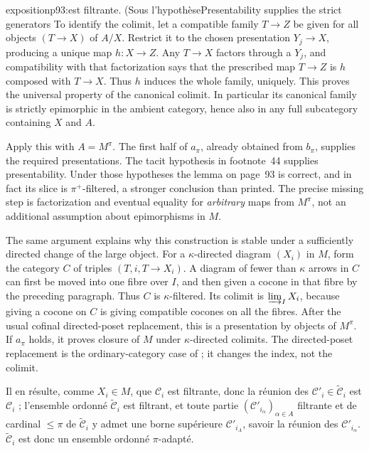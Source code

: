 \begin{dcomment}{exposition}{p93:est filtrante. (Sous l'hypothèse}{Presentability supplies the strict generators}
To identify the colimit, let a compatible family $T\to Z$ be given for all objects $(T\to X)$ of $A/X$. Restrict it to the chosen presentation $Y_j\to X$, producing a unique map $h:X\to Z$. Any $T\to X$ factors through a $Y_j$, and compatibility with that factorization says that the prescribed map $T\to Z$ is $h$ composed with $T\to X$. Thus $h$ induces the whole family, uniquely. This proves the universal property of the canonical colimit. In particular its canonical family is strictly epimorphic in the ambient category, hence also in any full subcategory containing $X$ and $A$.

Apply this with $A=M^\pi$. The first half of $a_\pi$, already obtained from $b_\pi$, supplies the required presentations. The tacit hypothesis in footnote~44 supplies presentability. Under those hypotheses the lemma on page~93 is correct, and in fact its slice is $\pi^+$-filtered, a stronger conclusion than printed. The precise missing step is factorization and eventual equality for \emph{arbitrary} maps from $M^\pi$, not an additional assumption about epimorphisms in $M$.

The same argument explains why this construction is stable under a sufficiently directed change of the large object. For a $\kappa$-directed diagram $(X_i)$ in $M$, form the category $C$ of triples $(T,i,T\to X_i)$. A diagram of fewer than $\kappa$ arrows in $C$ can first be moved into one fibre over $I$, and then given a cocone in that fibre by the preceding paragraph. Thus $C$ is $\kappa$-filtered. Its colimit is $\varinjlim_I X_i$, because giving a cocone on $C$ is giving compatible cocones on all the fibres. After the usual cofinal directed-poset replacement, this is a presentation by objects of $M^\pi$. If $a_\pi$ holds, it proves closure of $M$ under $\kappa$-directed colimits. The directed-poset replacement is the ordinary-category case of \citet[Proposition~5.3.1.18]{Lurie2009HTT}; it changes the index, not the colimit.
\end{dcomment}


Il en résulte, comme $X_i\in M$, que $\mathcal{C}_i$ est filtrante, donc la réunion des $\mathcal{C}'_i\in\tilde{\mathcal{C}}_i$ est $\mathcal{C}_i$ ; l'ensemble ordonné $\tilde{\mathcal{C}}_i$ est filtrant, et toute partie $(\mathcal{C}'_{i_\alpha})_{\alpha\in A}$ filtrante et de cardinal $\le\pi$ de $\tilde{\mathcal{C}}_i$ y admet une borne supérieure $\mathcal{C}'_{i_A}$, savoir la réunion des $\mathcal{C}'_{i_\alpha}$. $\tilde{\mathcal{C}}_i$ est donc un ensemble ordonné $\pi$-adapté.

